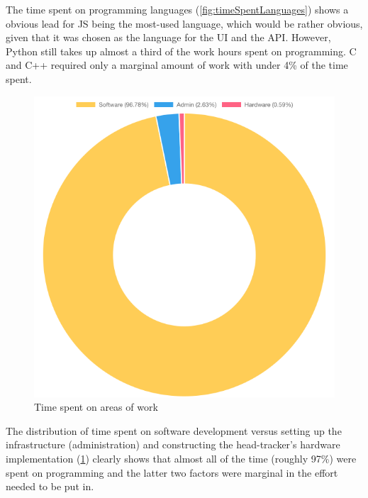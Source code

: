 The time spent on programming languages (\ref{fig:timeSpentLanguages}) shows a obvious lead for \ac{JS} being the most-used language, which would be rather obvious, given that it was chosen as the language for the \ac{UI} and the \ac{API}. However, Python still takes up almost a third of the work hours spent on programming. C and C++ required only a marginal amount of work with under 4\% of the time spent.

\begin{figure}[h]
\centering
\includegraphics[scale=0.5]{04_Artefakte/01_Abbildungen/time-spent-on-types-of-work}
\caption[Time spent on areas of work]{Time spent on areas of work\protect}
\label{fig:timeSpentTypeOfWork}
\end{figure}

The distribution of time spent on software development versus setting up the infrastructure (administration) and constructing the head-tracker's hardware implementation (\ref{fig:timeSpentTypeOfWork}) clearly shows that almost all of the time (roughly 97\%) were spent on programming and the latter two factors were marginal in the effort needed to be put in.

